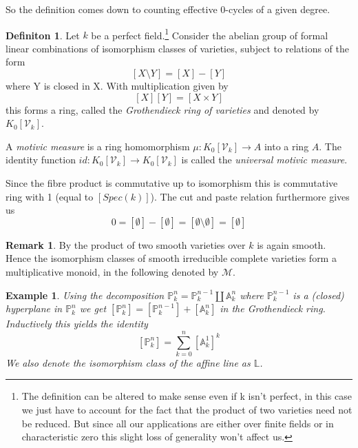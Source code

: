 \documentclass[11pt, a4paper, german]{article}
\theoremstyle{plain}
\newtheorem{example}[theorem]{Example}
\theoremstyle{definition}
\newtheorem{definition}[theorem]{Definiton}
\newtheorem{remark}[theorem]{Remark}
\newcommand{\gring}[1][k]{K_0[\mathcal{V}_#1]}
\begin{document}
So the definition comes down to counting effective 0-cycles of a given degree. 

\begin{definition}
    Let $k$ be a perfect field.\footnote{The definition can be altered to make sense even if k isn't perfect, 
    in this case we just have to account for the fact that the product of two varieties need not be reduced. 
    But since all our applications are either over finite fields or in characteristic zero this slight loss of generality won't affect us.}
    Consider the abelian group of formal linear combinations of isomorphism classes of varieties, subject to relations of the form
    \[
        [X \setminus Y] = [X] - [Y]
    \] where Y is closed in X.
    With multiplication given by
    \[
        [X][Y] = [X \times Y]
    \]
    this forms a ring, called the \emph{Grothendieck ring of varieties} and denoted by $\gring$. 
    
    A \emph{motivic measure} is a ring homomorphism $\mu: \gring \to A$ into a ring $A$. The identity function
    $id: \gring \to \gring$ is called the \emph{universal motivic measure}.
\end{definition}

Since the fibre product is commutative up to isomorphism this  is commutative ring with 1 (equal to $[Spec(k)]$). 
The cut and paste relation furthermore gives us
\[
    0 = [\emptyset] - [\emptyset] = [\emptyset \setminus \emptyset] = [\emptyset]
\]


\begin{remark}
    By \cite[Proposition 10.1 (d)]{Ha} the product of two smooth varieties over $k$ is again smooth. Hence the isomorphism classes of smooth
    irreducible complete varieties form a multiplicative monoid, in the following denoted by $\mathcal{M}$.
\end{remark}

\begin{example}
    \label{projSum}
    Using the decomposition $\mathbb{P}_k^n = \mathbb{P}_k^{n-1} \coprod \mathbb{A}_k^n$ where $\mathbb{P}_k^{n-1}$ is a (closed) hyperplane
    in $\mathbb{P}_k^n$  we get $[\mathbb{P}_k^n] = [\mathbb{P}_k^{n-1}] + [\mathbb{A}_k^n]$ in the Grothendieck ring.
    Inductively this yields the identity 
    \[
        [\mathbb{P}_k^n] = \sum_{k=0}^n [\mathbb{A}_k^1]^k
    \]
    We also denote the isomorphism class of the affine line as $\mathbb{L}$.
\end{example}
\end{document}
